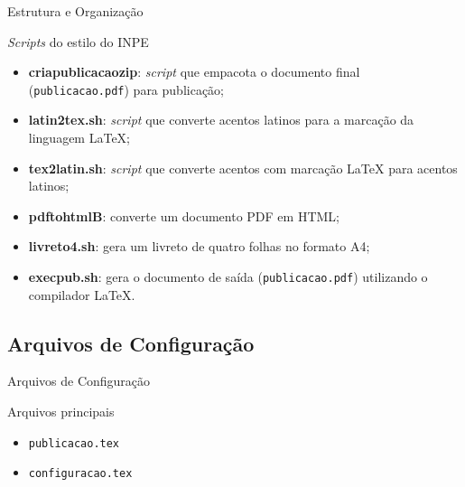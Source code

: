 \documentclass[10pt]{beamer}
\begin{document}
\begin{frame}{Estrutura e Organização}
    \begin{block}{\textit{Scripts} do estilo do INPE}
        \begin{itemize}[label=\textbullet]
            \pause
            \item \textbf{criapublicacaozip}: \textit{script} que empacota o documento final ({\tt publicacao.pdf}) para publicação;
            \pause
            \item \textbf{latin2tex.sh}: \textit{script} que converte acentos latinos para a marcação da linguagem \LaTeX{};
            \pause
            \item \textbf{tex2latin.sh}: \textit{script} que converte acentos com marcação \LaTeX{} para acentos latinos;
            \pause
            \item \textbf{pdftohtmlB}: converte um documento PDF em HTML;
            \pause
            \item \textbf{livreto4.sh}: gera um livreto de quatro folhas no formato A4;
            \pause
            \item \textbf{execpub.sh}: gera o documento de saída ({\tt publicacao.pdf}) utilizando o compilador \LaTeX{}. 
        \end{itemize}       
    \end{block}
\end{frame}

\subsection{Arquivos de Configuração}

\begin{frame}{Arquivos de Configuração}
    \begin{block}{Arquivos principais}
        \begin{itemize}[label=\textbullet]
            \item {\tt publicacao.tex}
            \item {\tt configuracao.tex}
        \end{itemize}
    \end{block}
\end{frame}

\begingroup
{}
\begin{frame}{}
\end{frame}
\end{document}

